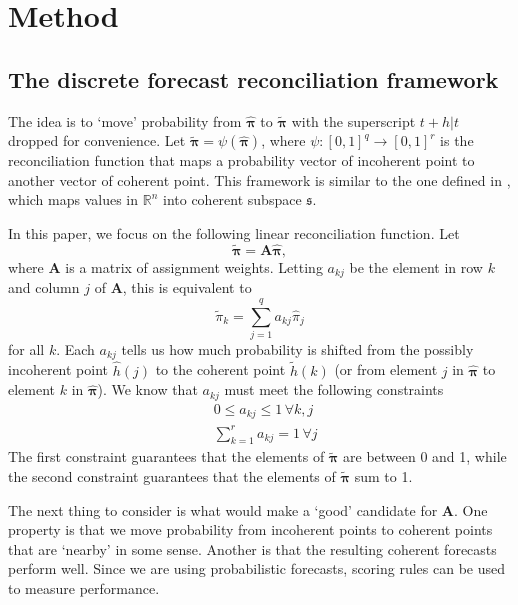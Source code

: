 \documentclass[a4paper,review,12pt,authoryear]{elsarticle}
\newcommand{\bpi}{\bm{\pi}}
\begin{document}
  \section{Method}
  \label{sec:method}
  
      \subsection{The discrete forecast reconciliation framework}
      
      The idea is to `move' probability from $\hat{\bpi}$ to $\tilde{\bpi}$ with the superscript $t+h|t$ dropped for convenience.  
      Let $\tilde{\bpi} = \psi(\hat{\bpi})$, where $\psi:[0,1]^q \rightarrow [0,1]^r$ is the reconciliation function that maps a probability vector of incoherent point to another vector of coherent point. 
      This framework is similar to the one defined in \cite{anagiotelisForecastReconciliationGeometric2021}, which maps values in $\mathbb{R}^n$ into coherent subspace $\mathfrak{s}$.
  
      In this paper, we focus on the following linear reconciliation function.
      Let
      \begin{equation}
        \label{eq:framework}
      \tilde{\bpi}=\bm{A}\hat{\bpi},
      \end{equation}
      where $\bm{A}$ is a matrix of assignment weights. Letting $a_{kj}$ be the element in row $k$ and column $j$ of $\bm{A}$, this is equivalent to
      \[
        \tilde{\pi}_k=\sum\limits_{j=1}^q a_{kj}\hat{{\pi}}_j
      \]
      for all $k$. 
      Each $a_{kj}$ tells us how much probability is shifted from the possibly incoherent point $\hat{h}(j)$ to the coherent point $\tilde{h}(k)$ (or from element $j$ in $\hat{\bpi}$ to element $k$ in $\hat{\bpi}$). We know that $a_{kj}$ must meet the following constraints
      \begin{align*}
      &0\leq a_{kj} \leq 1 \,\forall k, j\\ 
      &\sum\limits_{k=1}^r a_{kj} = 1 \,\forall j 
      \end{align*}
      The first constraint guarantees that the elements of $\tilde{\bpi}$ are between 0 and 1, while the second constraint guarantees that the elements of $\tilde{\bpi}$ sum to 1.
      
      The next thing to consider is what would make a `good' candidate for $\bm{A}$. One property is that we move probability from incoherent points to coherent points that are  `nearby' in some sense. Another is that the resulting coherent forecasts perform well. Since we are using probabilistic forecasts, scoring rules can be used to measure performance.
      
\end{document}
